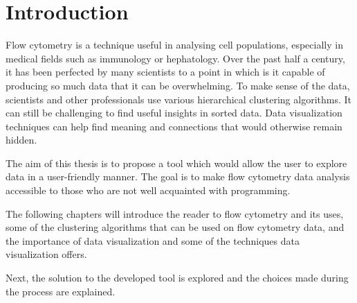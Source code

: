 \chapter{Introduction}
Flow cytometry is a technique useful in analysing cell populations, especially in medical fields such as immunology or hephatology. Over the past half a century, it has been perfected by many scientists to a point in which is it capable of producing so much data that it can be overwhelming. To make sense of the data, scientists and other professionals use various hierarchical clustering algorithms. It can still be challenging to find useful insights in sorted data. Data visualization techniques can help find meaning and connections that would otherwise remain hidden.

The aim of this thesis is to propose a tool which would allow the user to explore data in a user-friendly manner. The goal is to make flow cytometry data analysis accessible to those who are not well acquainted with programming.

The following chapters will introduce the reader to flow cytometry and its uses, some of the clustering algorithms that can be used on flow cytometry data, and the importance of data visualization and some of the techniques data visualization offers. 

Next, the solution to the developed tool is explored and the choices made during the process are explained. 

